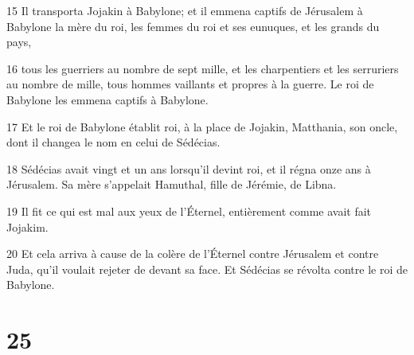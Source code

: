\par 15 Il transporta Jojakin à Babylone; et il emmena captifs de Jérusalem à Babylone la mère du roi, les femmes du roi et ses eunuques, et les grands du pays,
\par 16 tous les guerriers au nombre de sept mille, et les charpentiers et les serruriers au nombre de mille, tous hommes vaillants et propres à la guerre. Le roi de Babylone les emmena captifs à Babylone.
\par 17 Et le roi de Babylone établit roi, à la place de Jojakin, Matthania, son oncle, dont il changea le nom en celui de Sédécias.
\par 18 Sédécias avait vingt et un ans lorsqu'il devint roi, et il régna onze ans à Jérusalem. Sa mère s'appelait Hamuthal, fille de Jérémie, de Libna.
\par 19 Il fit ce qui est mal aux yeux de l'Éternel, entièrement comme avait fait Jojakim.
\par 20 Et cela arriva à cause de la colère de l'Éternel contre Jérusalem et contre Juda, qu'il voulait rejeter de devant sa face. Et Sédécias se révolta contre le roi de Babylone.

\chapter{25}

